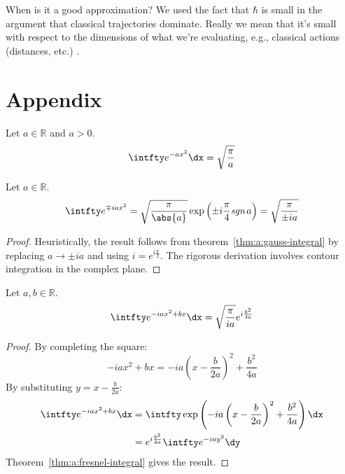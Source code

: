 \documentclass[a4paper]{extarticle}
\begin{document}
When is it a good approximation?
We used the fact that $\hbar$ is small in the argument that classical
trajectories dominate.
Really we mean that it's small with respect to the dimensions of what we're
evaluating, e.g., classical actions (distances, etc.)
.

\section*{Appendix}

\begin{thm}
  \label{thm:a:gauss-integral}
  Let $a \in \mathbb{R}$ and $a > 0$.
  \begin{equation}
    \label{eqn:a:gauss-integral}
    \intfty e^{-ax^2} \dx = \sqrt{\frac{\pi}{a}}
  \end{equation}
\end{thm}

\begin{thm}
  \label{thm:a:fresnel-integral}
  Let $a \in \mathbb{R}$.
  \begin{equation}
    \label{eqn:a:fresnel-integral}
    \intfty e^{\mp iax^2}
    = \sqrt{\frac{\pi}{\abs{a}}} \exp\left(\pm i\frac{\pi}{4} \emph{sgn}\,a\right)
    = \sqrt{\frac{\pi}{\pm ia}}
  \end{equation}
  \begin{proof}
    Heuristically, the result follows from theorem~\ref{thm:a:gauss-integral} by
    replacing $a \to \pm ia$ and using $i = e^{i\frac{\pi}{2}}$.
    The rigorous derivation involves contour integration in the complex plane.
  \end{proof}
\end{thm}

\begin{thm}
  \label{thm:a:shifted-fresnel-integral}
  Let $a, b \in \mathbb{R}$.
  \begin{align}
    \label{eqn:a:shifted-fresnel-integral}
    \intfty e^{-iax^2 + bx} \dx = \sqrt{\frac{\pi}{ia}} e^{i \frac{b^2}{4a}}
  \end{align}
  \begin{proof}
    By completing the square:
    \begin{equation*}
      -iax^2 + bx = -ia\left(x - \frac{b}{2a}\right)^2 + \frac{b^2}{4a}
    \end{equation*}
    By substituting $y = x - \frac{b}{2a}$:
    \begin{align*}
      \intfty e^{-iax^2 + bx} \dx
       & = \intfty \exp\left(-ia\left(x - \frac{b}{2a}\right)^2 + \frac{b^2}{4a}\right) \dx
      \\
       & = e^{i \frac{b^2}{4a}} \intfty e^{-iay^2} \dy
    \end{align*}
    Theorem~\ref{thm:a:fresnel-integral} gives the result.
  \end{proof}
\end{thm}
\end{document}
